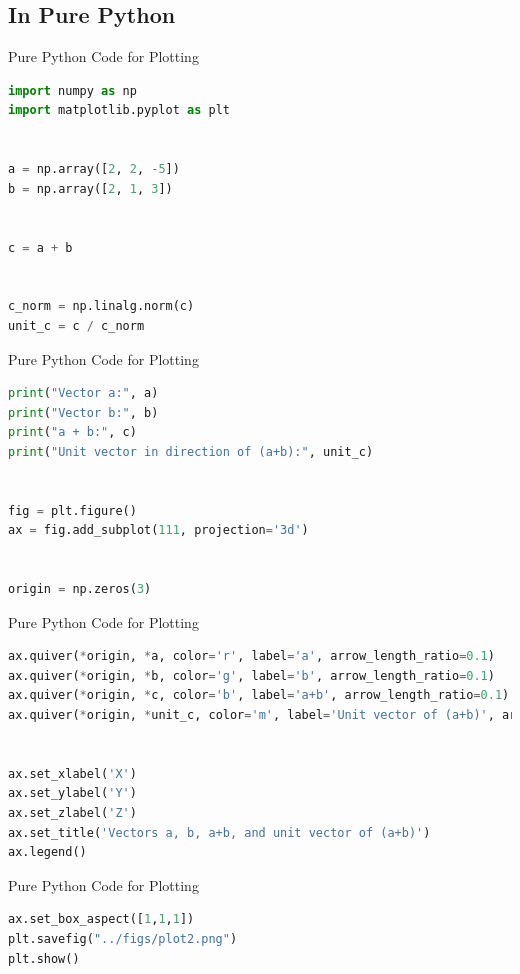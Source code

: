 \documentclass{beamer}
\theoremstyle{remark}
\numberwithin{equation}{section}
\begin{document}
\subsection{In Pure Python}
\begin{frame}[fragile]{Pure Python Code for Plotting}
\begin{lstlisting}[language=Python]
import numpy as np
import matplotlib.pyplot as plt


a = np.array([2, 2, -5])
b = np.array([2, 1, 3])


c = a + b


c_norm = np.linalg.norm(c)
unit_c = c / c_norm


\end{lstlisting}
\end{frame}
\begin{frame}[fragile]{Pure Python Code for Plotting}
\begin{lstlisting}[language=Python]
print("Vector a:", a)
print("Vector b:", b)
print("a + b:", c)
print("Unit vector in direction of (a+b):", unit_c)


fig = plt.figure()
ax = fig.add_subplot(111, projection='3d')


origin = np.zeros(3)
\end{lstlisting}
\end{frame}
\begin{frame}[fragile]{Pure Python Code for Plotting}
\begin{lstlisting}[language=Python]
ax.quiver(*origin, *a, color='r', label='a', arrow_length_ratio=0.1)
ax.quiver(*origin, *b, color='g', label='b', arrow_length_ratio=0.1)
ax.quiver(*origin, *c, color='b', label='a+b', arrow_length_ratio=0.1)
ax.quiver(*origin, *unit_c, color='m', label='Unit vector of (a+b)', arrow_length_ratio=0.2)


ax.set_xlabel('X')
ax.set_ylabel('Y')
ax.set_zlabel('Z')
ax.set_title('Vectors a, b, a+b, and unit vector of (a+b)')
ax.legend()
\end{lstlisting}
\end{frame}
\begin{frame}[fragile]{Pure Python Code for Plotting}
\begin{lstlisting}[language=Python]
ax.set_box_aspect([1,1,1])
plt.savefig("../figs/plot2.png")
plt.show()
\end{lstlisting}
\end{frame}
\end{document}
